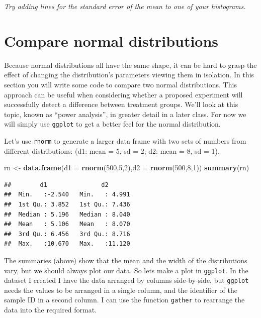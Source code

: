 \documentclass[
  a4paperpaper,
]{book}
\newenvironment{Shaded}{\begin{snugshade}}{\end{snugshade}}
\newcommand{\DataTypeTok}[1]{\textcolor[rgb]{0.13,0.29,0.53}{#1}}
\newcommand{\DecValTok}[1]{\textcolor[rgb]{0.00,0.00,0.81}{#1}}
\newcommand{\KeywordTok}[1]{\textcolor[rgb]{0.13,0.29,0.53}{\textbf{#1}}}
\newcommand{\NormalTok}[1]{#1}
\newcommand{\StringTok}[1]{\textcolor[rgb]{0.31,0.60,0.02}{#1}}
\begin{document}
\emph{Try adding lines for the standard error of the mean to one of your histograms.}

\hypertarget{compare-normal-distributions}{%
\section{Compare normal distributions}\label{compare-normal-distributions}}

Because normal distributions all have the same shape, it can be hard to grasp the effect of changing the distribution's parameters viewing them in isolation. In this section you will write some code to compare two normal distributions. This approach can be useful when considering whether a proposed experiment will successfully detect a difference between treatment groups. We'll look at this topic, known as ``power analysis'', in greater detail in a later class. For now we will simply use \texttt{ggplot} to get a better feel for the normal distribution.

Let's use \texttt{rnorm} to generate a larger data frame with two sets of numbers from different distributions: (d1: mean = 5, sd = 2; d2: mean = 8, sd = 1).

\begin{Shaded}
\begin{Highlighting}[]
\NormalTok{rn \textless{}{-}}\StringTok{ }\KeywordTok{data.frame}\NormalTok{(}\DataTypeTok{d1 =} \KeywordTok{rnorm}\NormalTok{(}\DecValTok{500}\NormalTok{,}\DecValTok{5}\NormalTok{,}\DecValTok{2}\NormalTok{),}\DataTypeTok{d2 =} \KeywordTok{rnorm}\NormalTok{(}\DecValTok{500}\NormalTok{,}\DecValTok{8}\NormalTok{,}\DecValTok{1}\NormalTok{))}
\KeywordTok{summary}\NormalTok{(rn)}
\end{Highlighting}
\end{Shaded}

\begin{verbatim}
##        d1               d2        
##  Min.   :-2.540   Min.   : 4.991  
##  1st Qu.: 3.852   1st Qu.: 7.436  
##  Median : 5.196   Median : 8.040  
##  Mean   : 5.106   Mean   : 8.070  
##  3rd Qu.: 6.456   3rd Qu.: 8.716  
##  Max.   :10.670   Max.   :11.120
\end{verbatim}

The summaries (above) show that the mean and the width of the distributions vary, but we should always plot our data. So lets make a plot in \texttt{ggplot}. In the dataset I created I have the data arranged by columns side-by-side, but \texttt{ggplot} needs the values to be arranged in a single column, and the identifier of the sample ID in a second column. I can use the function \texttt{gather} to rearrange the data into the required format.
\end{document}
